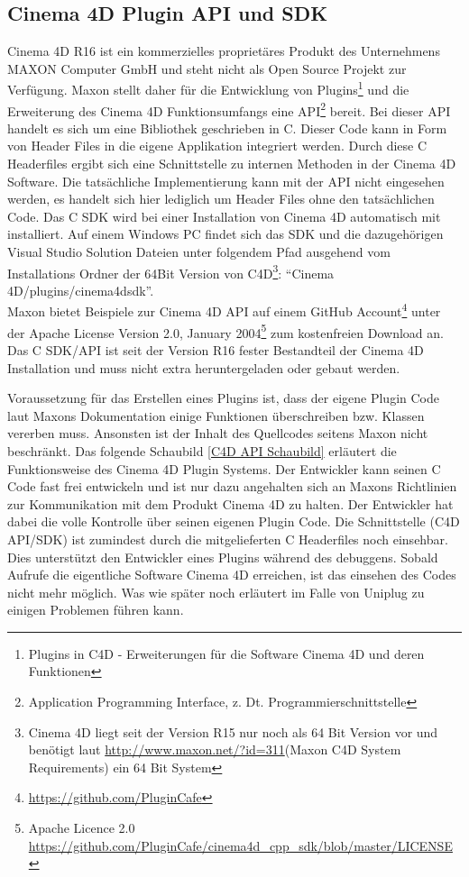 \documentclass[pagesize, paper=a4, fontsize=12pt, titlepage=true, headings=small, headnosepline, abstractoff, liststotoc, nochapterprefix, plainheadsepline, twoside]{scrreprt}
\newcommand{\CPP}{C\nolinebreak\hspace{-.05em}\raisebox{.4ex}{\tiny\bf +}\nolinebreak\hspace{-.10em}\raisebox{.4ex}{\tiny\bf +}}
\newcommand{\CPPS}{C\nolinebreak\hspace{-.05em}\raisebox{.4ex}{\tiny\bf +}\nolinebreak\hspace{-.10em}\raisebox{.4ex}{\tiny\bf +} }
\begin{document}
\subsection{Cinema 4D Plugin API und SDK}
Cinema 4D R16 \autocite{MaxonC4d2014} ist ein kommerzielles proprietäres Produkt des Unternehmens MAXON Computer GmbH und steht nicht als Open Source Projekt zur Verfügung. Maxon stellt daher für die Entwicklung von Plugins\footnote{Plugins in C4D - Erweiterungen für die Software Cinema 4D und deren Funktionen} und die Erweiterung des Cinema 4D Funktionsumfangs eine API\footnote{Application Programming Interface, z. Dt. Programmierschnittstelle} bereit. Bei dieser API handelt es sich um eine Bibliothek geschrieben in \CPP. Dieser Code kann in Form von Header Files in die eigene Applikation integriert werden. Durch diese \CPPS Headerfiles ergibt sich eine Schnittstelle zu internen Methoden in der Cinema 4D Software. Die tatsächliche Implementierung kann mit der API nicht eingesehen werden, es handelt sich hier lediglich um Header Files ohne den tatsächlichen Code. Das \CPPS SDK wird bei einer Installation von Cinema 4D automatisch mit installiert. Auf einem Windows PC findet sich das SDK und die dazugehörigen Visual Studio Solution Dateien unter folgendem Pfad ausgehend vom Installations Ordner der 64Bit Version von C4D\footnote{Cinema 4D liegt seit der Version R15 nur noch als 64 Bit Version vor und benötigt laut \url{http://www.maxon.net/?id=311}(Maxon C4D System Requirements) ein 64 Bit System}: {“Cinema 4D/plugins/cinema4dsdk”}.
\\
Maxon bietet Beispiele zur Cinema 4D API auf einem GitHub Account\footnote{\url{https://github.com/PluginCafe}} unter der Apache License Version 2.0, January 2004\footnote{Apache Licence 2.0 \url{https://github.com/PluginCafe/cinema4d_cpp_sdk/blob/master/LICENSE}} zum kostenfreien Download an. Das \CPPS SDK/API ist seit der Version R16 fester Bestandteil der Cinema 4D Installation und muss nicht extra heruntergeladen oder gebaut werden.

Voraussetzung für das Erstellen eines Plugins ist, dass der eigene Plugin Code laut Maxons Dokumentation einige Funktionen überschreiben bzw. Klassen vererben muss. Ansonsten ist der Inhalt des Quellcodes seitens Maxon nicht beschränkt. Das folgende Schaubild \ref{C4D API Schaubild} erläutert die Funktionsweise des Cinema 4D Plugin Systems. Der Entwickler kann seinen \CPPS Code fast frei entwickeln und ist nur dazu angehalten sich an Maxons Richtlinien zur Kommunikation mit dem Produkt Cinema 4D zu halten. Der Entwickler hat dabei die volle Kontrolle über seinen eigenen Plugin Code. Die Schnittstelle (C4D API/SDK) ist zumindest durch die mitgelieferten \CPPS Headerfiles noch einsehbar. Dies unterstützt den Entwickler eines Plugins während des debuggens. Sobald Aufrufe die eigentliche Software Cinema 4D erreichen, ist das einsehen des Codes nicht mehr möglich. Was wie später noch erläutert im Falle von Uniplug zu einigen Problemen führen kann.
\end{document}
